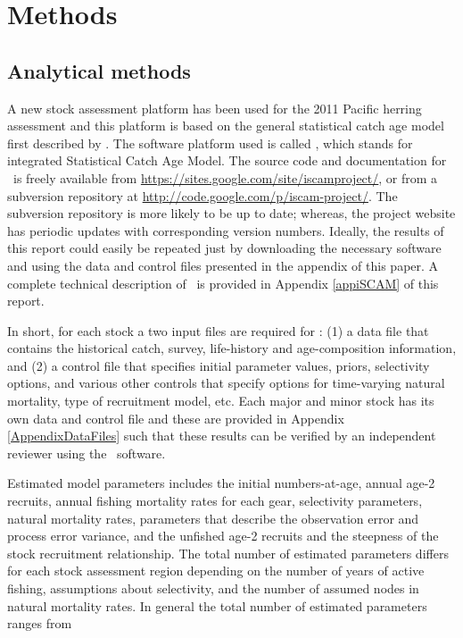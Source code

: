 \section{Methods}


	\subsection{Analytical methods}
	A new stock assessment platform has been used for the 2011 Pacific herring assessment and this platform is based on the general statistical catch age model first described by \cite{fournier1982general}.  The software platform used is called \iscam, which stands for integrated Statistical Catch Age Model.  The source code and documentation for \iscam\ is freely available from \url{https://sites.google.com/site/iscamproject/}, or from a subversion repository at \url{http://code.google.com/p/iscam-project/}.  The subversion repository is more likely to be up to date; whereas, the project website has periodic updates with corresponding version numbers.  Ideally, the results of this report could easily be repeated just by downloading the necessary software and using the data and control files presented in the appendix of this paper. A complete technical description of \iscam\ is provided in Appendix \ref{appiSCAM} of this report.
	
	In short, for each stock a two input files are required for \iscam: (1) a data file that contains the historical catch, survey, life-history and age-composition information, and (2) a control file that specifies initial parameter values, priors, selectivity options, and various other controls that specify options for time-varying natural mortality, type of recruitment model, etc.  Each major and minor stock has its own data and control file and these are provided in Appendix \ref{AppendixDataFiles} such that these results can be verified by an independent reviewer using the \iscam\ software.
	
	Estimated model parameters includes the initial numbers-at-age, annual age-2 recruits, annual fishing mortality rates for each gear, selectivity parameters, natural mortality rates, parameters that describe the observation error and process error variance, and the unfished age-2 recruits and the steepness of the stock recruitment relationship.  The total number of estimated parameters differs for each stock assessment region depending on the number of years of active fishing, assumptions about selectivity, and the number of assumed nodes in natural mortality rates.  In general the total number of estimated parameters ranges from  
	

